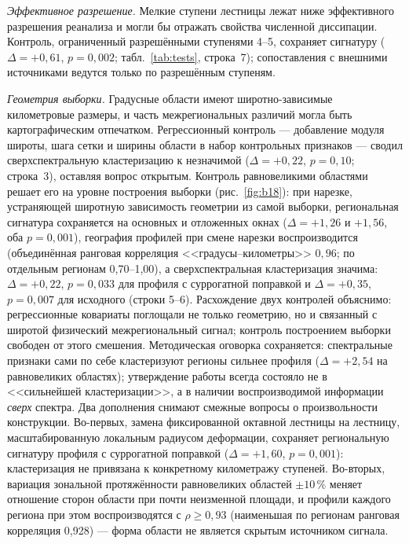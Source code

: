 \documentclass[11pt,a4paper]{article}
\begin{document}
\emph{Эффективное разрешение.} Мелкие ступени лестницы лежат ниже эффективного разрешения реанализа и могли бы отражать свойства численной диссипации. Контроль, ограниченный разрешёнными ступенями 4--5, сохраняет сигнатуру ($\Delta=+0{,}61$, $p=0{,}002$; табл.~\ref{tab:tests}, строка~7); сопоставления с внешними источниками ведутся только по разрешённым ступеням.

\emph{Геометрия выборки.} Градусные области имеют широтно-зависимые километровые размеры, и часть межрегиональных различий могла быть картографическим отпечатком. Регрессионный контроль --- добавление модуля широты, шага сетки и ширины области в набор контрольных признаков --- сводил сверхспектральную кластеризацию к незначимой ($\Delta=+0{,}22$, $p=0{,}10$; строка~3), оставляя вопрос открытым. Контроль равновеликими областями решает его на уровне построения выборки (рис.~\ref{fig:b18}): при нарезке, устраняющей широтную зависимость геометрии из самой выборки, региональная сигнатура сохраняется на основных и отложенных окнах ($\Delta=+1{,}26$ и $+1{,}56$, оба $p=0{,}001$), география профилей при смене нарезки воспроизводится (объединённая ранговая корреляция <<градусы--километры>> $0{,}96$; по отдельным регионам 0,70--1,00), а сверхспектральная кластеризация значима: $\Delta=+0{,}22$, $p=0{,}033$ для профиля с суррогатной поправкой и $\Delta=+0{,}35$, $p=0{,}007$ для исходного (строки 5--6). Расхождение двух контролей объяснимо: регрессионные ковариаты поглощали не только геометрию, но и связанный с широтой физический межрегиональный сигнал; контроль построением выборки свободен от этого смешения. Методическая оговорка сохраняется: спектральные признаки сами по себе кластеризуют регионы сильнее профиля ($\Delta=+2{,}54$ на равновеликих областях); утверждение работы всегда состояло не в <<сильнейшей кластеризации>>, а в наличии воспроизводимой информации \emph{сверх} спектра. Два дополнения снимают смежные вопросы о произвольности конструкции. Во-первых, замена фиксированной октавной лестницы на лестницу, масштабированную локальным радиусом деформации, сохраняет региональную сигнатуру профиля с суррогатной поправкой ($\Delta=+1{,}60$, $p=0{,}001$): кластеризация не привязана к конкретному километражу ступеней. Во-вторых, вариация зональной протяжённости равновеликих областей $\pm10\,\%$ меняет отношение сторон области при почти неизменной площади, и профили каждого региона при этом воспроизводятся с $\rho\ge0{,}93$ (наименьшая по регионам ранговая корреляция 0,928) --- форма области не является скрытым источником сигнала.
\end{document}
